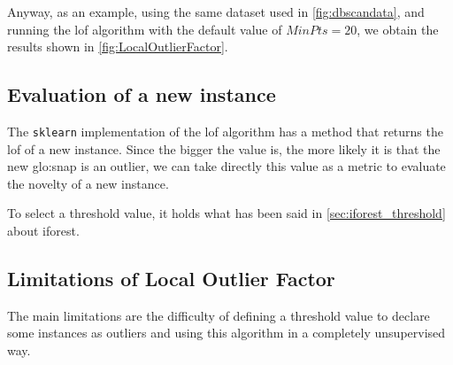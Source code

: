 Anyway, as an example, using the same dataset used in \autoref{fig:dbscandata}, and running the \gls{lof} algorithm with the default value of $MinPts=20$, we obtain the results shown in \autoref{fig:LocalOutlierFactor}.

\subsection{Evaluation of a new instance}
\label{sec:lof_eval}
The \texttt{sklearn} implementation of the \gls{lof} algorithm has a method that returns the \gls{lof} of a new instance. Since the bigger the value is, the more likely it is that the new \gls{glo:snap} is an outlier, we can take directly this value as a metric to evaluate the novelty of a new instance.

To select a threshold value, it holds what has been said in \autoref{sec:iforest_threshold} about \gls{iforest}.


\subsection{Limitations of Local Outlier Factor}
\label{sec:lof_limitations}
The main limitations are the difficulty of defining a threshold value to declare some instances as outliers and using this algorithm in a completely unsupervised way.


